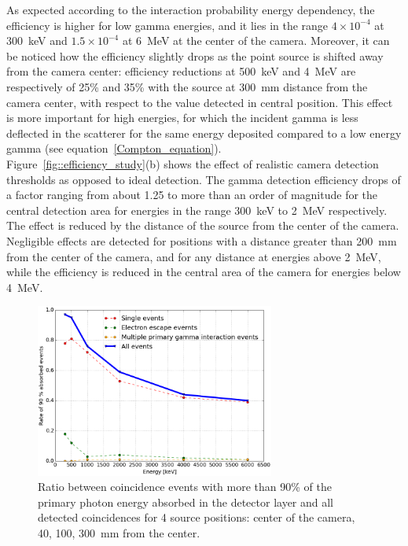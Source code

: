 As expected according to the interaction probability energy dependency, the efficiency is higher for low gamma energies, and it lies in the range $4\times10^{-4}$ at 300~keV and $1.5\times10^{-4}$ at 6~MeV at the center of the camera. Moreover, it can be noticed how the efficiency slightly drops as the point source is shifted away from the camera center: efficiency reductions at 500~keV and 4~MeV are respectively of 25\% and 35\% with the source at 300~mm distance from the camera center, with respect to the value detected in central position. This effect is more important for high energies, for which the incident gamma is less deflected in the scatterer for the same energy deposited compared to a low energy gamma (see equation~\ref{Compton_equation}).\\  
Figure~\ref{fig::efficiency_study}(b) shows the effect of realistic camera detection thresholds as opposed to ideal detection. The gamma detection efficiency drops of a factor ranging from about 1.25 to more than an order of magnitude for the central detection area for energies in the range 300~keV to 2~MeV respectively. The effect is reduced by the distance of the source from the center of the camera. Negligible effects are detected for positions with a distance greater than 200~mm from the center of the camera, and for any distance at energies above 2~MeV, while the efficiency is reduced in the central area of the camera for energies below 4~MeV.\\

\begin{figure} [!hbtp]	
\centering
\includegraphics[width=0.7\textwidth]{./Figure/new/90absFracVSenergy_hadronth.png}
\caption{Ratio between coincidence events with more than 90\% of the primary photon energy absorbed in the detector layer and all detected coincidences for 4 source positions: center of the camera, 40, 100, 300~mm from the center.}
\label{fig::rate_full_abs}
\end{figure}

